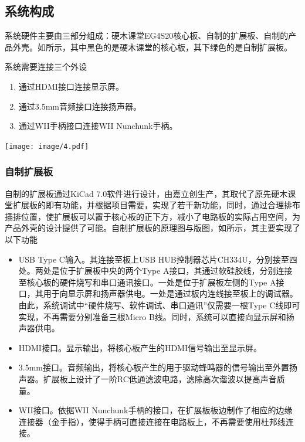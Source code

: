 \subsection{系统构成}
系统硬件主要由三部分组成：硬木课堂EG4S20核心板、自制的扩展板、自制的产品外壳。如所示，其中黑色的是硬木课堂的核心板，其下绿色的是自制扩展板。

系统需要连接三个外设
\begin{enumerate}
    \item 通过HDMI接口连接显示屏。
    \item 通过3.5mm音频接口连接扬声器。
    \item 通过WII手柄接口连接WII Nunchunk手柄。
\end{enumerate}

\begin{Figure}[系统硬件构成]
    \texttt{[image: image/4.pdf]}
\end{Figure}

\subsubsection{自制扩展板}
自制的扩展板通过KiCad 7.0软件进行设计，由嘉立创生产，其取代了原先硬木课堂扩展板的即有功能，并根据项目需要，实现了若干新功能，同时，通过合理排布插排位置，使扩展板可以置于核心板的正下方，减小了电路板的实际占用空间，为产品外壳的设计提供了可能。自制扩展板的原理图与版图，如所示，其主要实现了以下功能
\begin{itemize}
    \item USB Type C输入。其连接至板上USB HUB控制器芯片CH334U，分别接至四处。两处是位于扩展板中央的两个Type A接口，其通过软硅胶线，分别连接至核心板的硬件烧写和串口通讯接口。一处是位于扩展板左侧的Type A接口，其用于向显示屏和扬声器供电。一处是通过板内连线接至板上的调试器。由此，系统调试中“硬件烧写、软件调试、串口通讯”仅需要一根Type C线即可实现，不再需要分别准备三根Micro B线。同时，系统可以直接向显示屏和扬声器供电。
    \item HDMI接口。显示输出，将核心板产生的HDMI信号输出至显示屏。
    \item 3.5mm接口。音频输出，将核心板产生的用于驱动蜂鸣器的信号输出至外置扬声器。扩展板上设计了一阶RC低通滤波电路，滤除高次谐波以提高声音质量。
    \item WII接口。依据WII Nunchunk手柄的接口，在扩展板板边制作了相应的边缘连接器（金手指），使得手柄可直接连接在电路板上，不再需要使用杜邦线连接。
\end{itemize}

